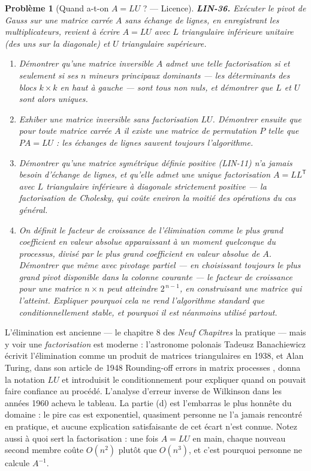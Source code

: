 \documentclass[11pt]{article}
\newtheorem{problem}{Problème}
\begin{document}
\begin{problem}[{Quand a-t-on $A = LU$ ? --- Licence}]
\textbf{LIN-36.} Exécuter le pivot de Gauss sur une matrice carrée $A$ sans échange de lignes,
en enregistrant les multiplicateurs, revient à écrire $A = LU$ avec $L$ triangulaire inférieure
unitaire (des uns sur la diagonale) et $U$ triangulaire supérieure.
\begin{enumerate}
\item[(a)] Démontrer qu'une matrice inversible $A$ admet une telle factorisation si et seulement si ses
$n$ mineurs principaux dominants --- les déterminants des blocs $k \times k$ en haut à gauche ---
sont tous non nuls, et démontrer que $L$ et $U$ sont alors uniques.
\item[(b)] Exhiber une matrice inversible sans factorisation $LU$. Démontrer ensuite que pour toute matrice
carrée $A$ il existe une matrice de permutation $P$ telle que $PA = LU$ : les échanges de lignes
sauvent toujours l'algorithme.
\item[(c)] Démontrer qu'une matrice symétrique définie positive (LIN-11) n'a jamais besoin d'échange de
lignes, et qu'elle admet une unique factorisation $A = L L^{\mathsf{T}}$ avec $L$ triangulaire
inférieure à diagonale strictement positive --- la factorisation de Cholesky, qui coûte environ la
moitié des opérations du cas général.
\item[(d)] On définit le facteur de croissance de l'élimination comme le plus grand coefficient en valeur
absolue apparaissant à un moment quelconque du processus, divisé par le plus grand coefficient en
valeur absolue de $A$. Démontrer que même avec pivotage partiel --- en choisissant toujours le plus
grand pivot disponible dans la colonne courante --- le facteur de croissance pour une matrice
$n \times n$ peut atteindre $2^{\,n-1}$, en construisant une matrice qui l'atteint. Expliquer
pourquoi cela ne rend l'algorithme standard que conditionnellement stable, et pourquoi il est
néanmoins utilisé partout.
\end{enumerate}

\end{problem}

\noindent L'élimination est ancienne --- le chapitre 8 des \textit{Neuf Chapitres} la pratique ---
mais y voir une \textit{factorisation} est moderne : l'astronome polonais Tadeusz Banachiewicz écrivit
l'élimination comme un produit de matrices triangulaires en 1938, et Alan Turing, dans son article de
1948 \og{} Rounding-off errors in matrix processes \fg{}, donna la notation $LU$ et introduisit le
conditionnement pour expliquer quand on pouvait faire confiance au procédé. L'analyse d'erreur
inverse de Wilkinson dans les années 1960 acheva le tableau. La partie (d) est l'embarras le plus
honnête du domaine : le pire cas est exponentiel, quasiment personne ne l'a jamais rencontré en
pratique, et aucune explication satisfaisante de cet écart n'est connue. Notez aussi à quoi sert la
factorisation : une fois $A = LU$ en main, chaque nouveau second membre coûte $O(n^2)$ plutôt que
$O(n^3)$, et c'est pourquoi personne ne calcule $A^{-1}$.
\end{document}
